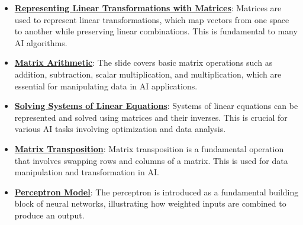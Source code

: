 \documentclass{article}%
\begin{document}
\begin{itemize}[leftmargin=*]%
\item \href{https://purdue.brightspace.com/d2l/common/assets/pdfjs-d2l-dist/1.0.14-legacy/web/viewer.html?file=\%2Fcontent\%2Fenforced\%2F1095467-wl.202510.CS.24300.001\%2F04L1-Linear Algebra Primer.pdf\%3Fou\%3D1095467\&lang=en-us\&container=d2l-fileviewer-rendered-pdf\&fullscreen=d2l-fileviewer-rendered-pdf-dialog\&height=667#page=5}{\textbf{Representing Linear Transformations with Matrices}}: Matrices are used to represent linear transformations, which map vectors from one space to another while preserving linear combinations. This is fundamental to many AI algorithms.%
\item \href{https://purdue.brightspace.com/d2l/common/assets/pdfjs-d2l-dist/1.0.14-legacy/web/viewer.html?file=\%2Fcontent\%2Fenforced\%2F1095467-wl.202510.CS.24300.001\%2F04L1-Linear Algebra Primer.pdf\%3Fou\%3D1095467\&lang=en-us\&container=d2l-fileviewer-rendered-pdf\&fullscreen=d2l-fileviewer-rendered-pdf-dialog\&height=667#page=9}{\textbf{Matrix Arithmetic}}: The slide covers basic matrix operations such as addition, subtraction, scalar multiplication, and multiplication, which are essential for manipulating data in AI applications.%
\item \href{https://purdue.brightspace.com/d2l/common/assets/pdfjs-d2l-dist/1.0.14-legacy/web/viewer.html?file=\%2Fcontent\%2Fenforced\%2F1095467-wl.202510.CS.24300.001\%2F04L1-Linear Algebra Primer.pdf\%3Fou\%3D1095467\&lang=en-us\&container=d2l-fileviewer-rendered-pdf\&fullscreen=d2l-fileviewer-rendered-pdf-dialog\&height=667#page=11}{\textbf{Solving Systems of Linear Equations}}: Systems of linear equations can be represented and solved using matrices and their inverses. This is crucial for various AI tasks involving optimization and data analysis.%
\item \href{https://purdue.brightspace.com/d2l/common/assets/pdfjs-d2l-dist/1.0.14-legacy/web/viewer.html?file=\%2Fcontent\%2Fenforced\%2F1095467-wl.202510.CS.24300.001\%2F04L1-Linear Algebra Primer.pdf\%3Fou\%3D1095467\&lang=en-us\&container=d2l-fileviewer-rendered-pdf\&fullscreen=d2l-fileviewer-rendered-pdf-dialog\&height=667#page=16}{\textbf{Matrix Transposition}}: Matrix transposition is a fundamental operation that involves swapping rows and columns of a matrix. This is used for data manipulation and transformation in AI.%
\item \href{https://purdue.brightspace.com/d2l/common/assets/pdfjs-d2l-dist/1.0.14-legacy/web/viewer.html?file=\%2Fcontent\%2Fenforced\%2F1095467-wl.202510.CS.24300.001\%2F04L1-Linear Algebra Primer.pdf\%3Fou\%3D1095467\&lang=en-us\&container=d2l-fileviewer-rendered-pdf\&fullscreen=d2l-fileviewer-rendered-pdf-dialog\&height=667#page=17}{\textbf{Perceptron Model}}: The perceptron is introduced as a fundamental building block of neural networks, illustrating how weighted inputs are combined to produce an output.%

\end{itemize}
\end{document}
